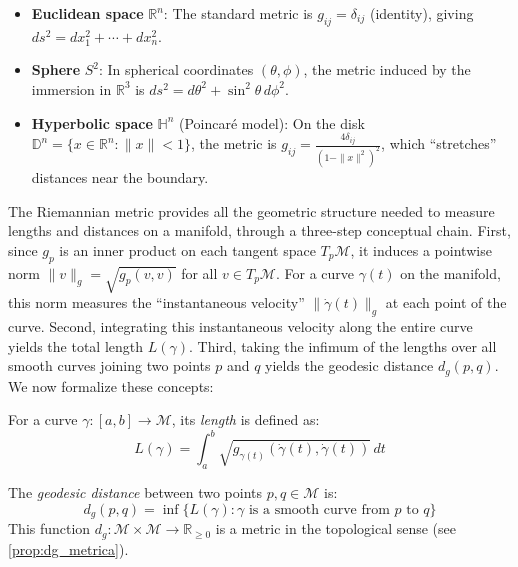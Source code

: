 \begin{example}\label{ex:metricas_variedades}
\leavevmode
\begin{itemize}
	\item \textbf{Euclidean space} $\mathbb{R}^n$: The standard metric is $g_{ij} = \delta_{ij}$ (identity), giving $ds^2 = dx_1^2 + \cdots + dx_n^2$.

	\item \textbf{Sphere} $S^2$: In spherical coordinates $(\theta, \phi)$, the metric induced by the immersion in $\mathbb{R}^3$ is $ds^2 = d\theta^2 + \sin^2\theta \, d\phi^2$.

	\item \textbf{Hyperbolic space} $\mathbb{H}^n$ (Poincaré model): On the disk $\mathbb{D}^n = \{x \in \mathbb{R}^n : \|x\| < 1\}$, the metric is $g_{ij} = \frac{4\delta_{ij}}{(1-\|x\|^2)^2}$, which ``stretches'' distances near the boundary.
\end{itemize}
\end{example}

The Riemannian metric provides all the geometric structure needed to measure lengths and distances on a manifold, through a three-step conceptual chain. First, since $g_p$ is an inner product on each tangent space $T_p\mathcal{M}$, it induces a pointwise norm $\|v\|_g = \sqrt{g_p(v,v)}$ for all $v \in T_p\mathcal{M}$. For a curve $\gamma(t)$ on the manifold, this norm measures the ``instantaneous velocity'' $\|\dot\gamma(t)\|_g$ at each point of the curve. Second, integrating this instantaneous velocity along the entire curve yields the total length $L(\gamma)$. Third, taking the infimum of the lengths over all smooth curves joining two points $p$ and $q$ yields the geodesic distance $d_g(p,q)$. We now formalize these concepts:

\begin{definition}\label{def:longitud_curvas}
For a curve $\gamma: [a,b] \to \mathcal{M}$, its \textit{length} is defined as:
\[
L(\gamma) = \int_a^b \sqrt{g_{\gamma(t)}(\dot{\gamma}(t), \dot{\gamma}(t))} \, dt
\]
\end{definition}

\begin{definition}\label{def:distancia_geodesica}
The \textit{geodesic distance} between two points $p, q \in \mathcal{M}$ is:
\[
d_g(p,q) = \inf\{L(\gamma) : \gamma \text{ is a smooth curve from } p \text{ to } q\}
\]
This function $d_g: \mathcal{M} \times \mathcal{M} \to \mathbb{R}_{\geq 0}$ is a metric in the topological sense (see \autoref{prop:dg_metrica}).
\end{definition}


